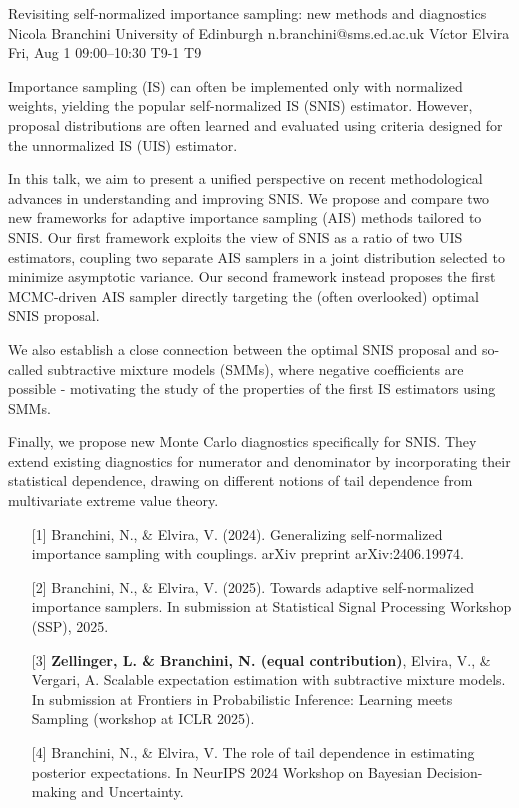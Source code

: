 \begin{talk}
  {Revisiting self-normalized importance sampling: new methods and diagnostics}%
  {Nicola Branchini}%
  {University of Edinburgh}%
  {n.branchini@sms.ed.ac.uk}%
  {Víctor Elvira}%
  {}%
  {Fri, Aug 1 09:00–10:30}%
  {T9-1}%
  {T9}%
  
				
			
Importance sampling (IS) can often be implemented only with normalized weights, yielding the popular self-normalized IS (SNIS) estimator. However, proposal distributions are often learned and evaluated using criteria designed for the unnormalized IS (UIS) estimator.

In this talk, we aim to present a unified perspective on recent methodological advances in understanding and improving SNIS.
We propose and compare two new frameworks for adaptive importance sampling (AIS) methods tailored to SNIS. Our first framework exploits the view of SNIS as a ratio of two UIS estimators, coupling two separate AIS samplers in a joint distribution selected to minimize asymptotic variance. Our second framework instead proposes the first MCMC-driven AIS sampler directly targeting the (often overlooked) optimal SNIS proposal.

We also establish a close connection between the optimal SNIS proposal and so-called subtractive mixture models (SMMs), where negative coefficients are possible - motivating the study of the properties of the first IS estimators using SMMs.

Finally, we propose new Monte Carlo diagnostics specifically for SNIS. They extend existing diagnostics for numerator and denominator by incorporating their statistical dependence, drawing on different notions of tail dependence from multivariate extreme value theory.

\medskip

\begin{enumerate}
	\item[{[1]}] Branchini, N., \& Elvira, V. (2024). Generalizing self-normalized importance sampling with couplings. arXiv preprint arXiv:2406.19974.
	\item[{[2]}] Branchini, N., \& Elvira, V. (2025). Towards adaptive self-normalized importance samplers. In submission at Statistical Signal Processing Workshop (SSP), 2025.
    \item[{[3]}] \textbf{Zellinger, L. \& Branchini, N. (equal contribution)}, Elvira, V., \& Vergari, A. Scalable expectation estimation with subtractive mixture models. In submission at Frontiers in Probabilistic Inference: Learning meets Sampling (workshop at ICLR 2025).
    \item[{[4]}] Branchini, N., \& Elvira, V. The role of tail dependence in estimating posterior expectations. In NeurIPS 2024 Workshop on Bayesian Decision-making and Uncertainty.


\end{enumerate}

\end{talk}

